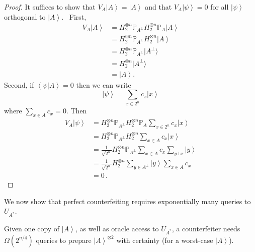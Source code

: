 \begin{proof}
It suffices to show that $V_{A}\left\vert A\right\rangle =\left\vert
A\right\rangle $ and that $V_{A}\left\vert \psi\right\rangle =0$ for all
$\left\vert \psi\right\rangle $ orthogonal to $\left\vert A\right\rangle $.
\ First,%
\begin{align*}
V_{A}\left\vert A\right\rangle  &  =H_{2}^{\otimes n}\mathbb{P}_{A^{\bot}%
}H_{2}^{\otimes n}\mathbb{P}_{A}\left\vert A\right\rangle \\
&  =H_{2}^{\otimes n}\mathbb{P}_{A^{\bot}}H_{2}^{\otimes n}\left\vert
A\right\rangle \\
&  =H_{2}^{\otimes n}\mathbb{P}_{A^{\bot}}|A^{\bot}\rangle\\
&  =H_{2}^{\otimes n}|A^{\bot}\rangle\\
&  =\left\vert A\right\rangle .
\end{align*}
Second, if $\left\langle \psi|A\right\rangle =0$ then we can write%
\[
\left\vert \psi\right\rangle =\sum_{x\in2^{n}}{c_{x}\left\vert x\right\rangle
}%
\]
where $\sum_{x\in A}c_{x}=0$. Then%
\begin{align*}
V_{A}\left\vert \psi\right\rangle  &  =H_{2}^{\otimes n}\mathbb{P}_{A^{\bot}%
}H_{2}^{\otimes n}\mathbb{P}_{A}\sum_{x\in2^{n}}{c_{x}\left\vert
x\right\rangle }\\
&  =H_{2}^{\otimes n}\mathbb{P}_{A^{\bot}}H_{2}^{\otimes n}\sum_{x\in A}%
{c_{x}\left\vert x\right\rangle }\\
&  =\frac{1}{\sqrt{2^{n}}}H_{2}^{\otimes n}\mathbb{P}_{A^{\bot}}\sum_{x\in
A}{c_{x}\sum_{y\bot x}\left\vert y\right\rangle }\\
&  =\frac{1}{\sqrt{2^{n}}}H_{2}^{\otimes n}\sum_{y\in A^{\perp}}{\left\vert
y\right\rangle \sum_{x\in A}c_{x}}\\
&  =0\,.
\end{align*}

\end{proof}

We now show that perfect counterfeiting requires exponentially many queries to
$U_{A^{\ast}}$.

\begin{theorem}
\label{nocopyc}Given one copy of
$\left\vert A\right\rangle $, as well as oracle access to $U_{A^{\ast}}$, a
counterfeiter needs $\Omega(  2^{n/4})  $ queries to prepare
$\left\vert A\right\rangle ^{\otimes2}$ with certainty (for a worst-case
$\left\vert A\right\rangle $).
\end{theorem}

